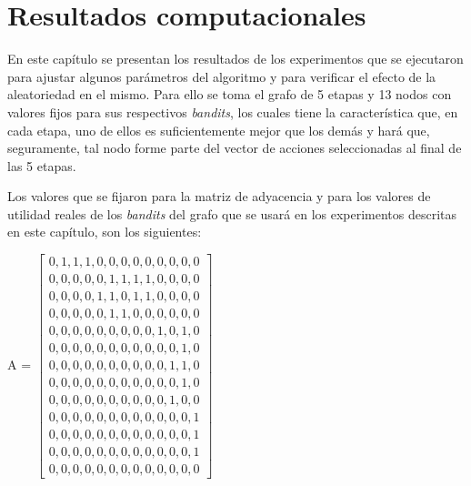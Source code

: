 \chapter{Resultados computacionales}
\label{resul_compu}

En este capítulo se presentan los resultados de los experimentos que se ejecutaron para ajustar algunos parámetros del algoritmo y para verificar el efecto de la aleatoriedad en el mismo. Para ello se toma el grafo de 5 etapas y 13 nodos con valores fijos para sus respectivos \textit{bandits}, los cuales tiene la característica que, en cada etapa, uno de ellos es suficientemente mejor que los demás y hará que, seguramente, tal nodo forme parte  del vector de acciones seleccionadas al final de las 5 etapas. 

Los valores que se fijaron para la matriz de adyacencia y para los valores de utilidad reales de los \textit{bandits} del grafo que se usará en los experimentos descritas en este capítulo, son los siguientes:

\renewcommand{\arraystretch}{0.5}
A = 
$\begin{bmatrix}

0, 1, 1,  1,  0,  0,  0,  0,  0,  0,  0,  0,  0\\
0, 0, 0,  0,  0,  1,  1,  1,  1,  0,  0,  0,  0\\
0, 0, 0,  0,  1,  1,  0,  1,  1,  0,  0,  0,  0\\
0, 0, 0,  0,  0,  1,  1,  0,  0,  0,  0,  0,  0\\
0, 0, 0,  0,  0,  0,  0,  0,  0,  1,  0,  1,  0\\
0, 0, 0,  0,  0,  0,  0,  0,  0,  0,  0,  1,  0\\
0, 0, 0,  0,  0,  0,  0,  0,  0,  0,  1,  1,  0\\
0, 0, 0,  0,  0,  0,  0,  0,  0,  0,  0,  1,  0\\
0, 0, 0,  0,  0,  0,  0,  0,  0,  0,  1,  0,  0\\
0, 0, 0,  0,  0,  0,  0,  0,  0,  0,  0,  0,  1\\
0, 0, 0,  0,  0,  0,  0,  0,  0,  0,  0,  0,  1\\
0, 0, 0,  0,  0,  0,  0,  0,  0,  0,  0,  0,  1\\
0, 0, 0,  0,  0,  0,  0,  0,  0,  0,  0,  0,  0
\end{bmatrix}$


